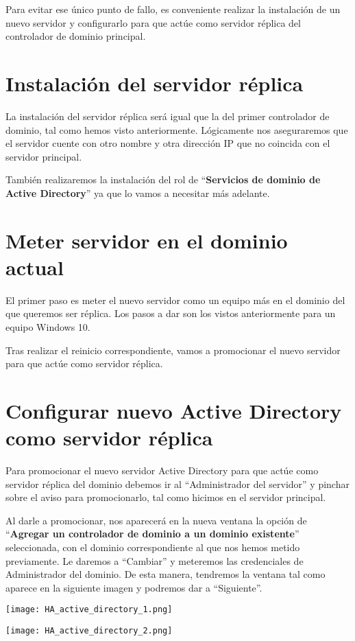 Para evitar ese único punto de fallo, es conveniente realizar la instalación de un nuevo servidor y configurarlo para que actúe como servidor réplica del controlador de dominio principal.


\section{Instalación del  servidor réplica}
La instalación del servidor réplica será igual que la del primer controlador de dominio, tal como hemos visto anteriormente. Lógicamente nos aseguraremos que el servidor cuente con otro nombre y otra dirección IP que no coincida con el servidor principal.

También realizaremos la instalación del rol de “\textbf{Servicios de dominio de Active Directory}” ya que lo vamos a necesitar más adelante.

\section{Meter servidor en el dominio actual}
El primer paso es meter el nuevo servidor como un equipo más en el dominio del que queremos ser réplica. Los pasos a dar son los vistos anteriormente para un equipo Windows 10.

Tras realizar el reinicio correspondiente, vamos a promocionar el nuevo servidor para que actúe como servidor réplica.


\section{Configurar nuevo Active Directory como servidor réplica}
Para promocionar el nuevo servidor Active Directory para que actúe como servidor réplica del dominio debemos ir al “Administrador del servidor” y pinchar sobre el aviso para promocionarlo, tal como hicimos en el servidor principal.

Al darle a promocionar, nos aparecerá en la nueva ventana la opción de “\textbf{Agregar un controlador de dominio a un dominio existente}” seleccionada, con el dominio correspondiente al que nos hemos metido previamente. Le daremos a “Cambiar” y meteremos las credenciales de Administrador del dominio. De esta manera, tendremos la ventana tal como aparece en la siguiente imagen y podremos dar a “Siguiente”.


{
    \begin{minipage}{0.48\linewidth}
        \texttt{[image: HA\_active\_directory\_1.png]}
    \end{minipage}
    \hfill
    \begin{minipage}{0.48\linewidth}
        \texttt{[image: HA\_active\_directory\_2.png]}
    \end{minipage}
    \vspace{1em}
}



